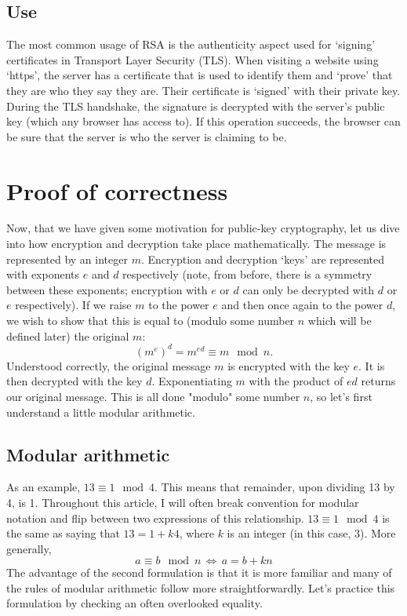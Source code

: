 \documentclass[]{scrartcl}
\theoremstyle{definition}
\begin{document}
\subsection{Use}
The most common usage of RSA is the authenticity aspect used for `signing' certificates in Transport Layer Security (TLS). When visiting a website using `https', the server has a certificate that is used to identify them and `prove' that they are who they say they are. Their certificate is `signed' with their private key. During the TLS handshake, the signature is decrypted with the server's public key (which any browser has access to). If this operation succeeds, the browser can be sure that the server is who the server is claiming to be.

\section{Proof of correctness}\label{sec:poc}
Now, that we have given some motivation for public-key cryptography, let us dive into how encryption and decryption take place mathematically. The message is represented by an integer $m$. Encryption and decryption `keys' are represented with exponents $e$ and $d$ respectively (note, from before, there is a symmetry between these exponents; encryption with $e$ or $d$ can only be decrypted with $d$ or $e$ respectively). If we raise $m$ to the power $e$ and then once again to the power $d$, we wish to show that this is equal to (modulo some number $n$ which will be defined later) the original $m$: 
\begin{equation}\label{eqn:statement}
    (m^e)^d = m^{ed} \equiv m \mod n.
\end{equation}
Understood correctly, the original message $m$ is encrypted with the key $e$. It is then decrypted with the key $d$. Exponentiating $m$ with the product of $ed$ returns our original message. This is all done "modulo" some number $n$, so let's first understand a little modular arithmetic.
\subsection{Modular arithmetic}
As an example, $13 \equiv 1 \mod 4$. This means that remainder, upon dividing 13 by 4, is 1. Throughout this article, I will often break convention for modular notation and flip between two expressions of this relationship. $13 \equiv 1 \mod 4$ is the same as saying that $13 = 1 + k4$, where $k$ is an integer (in this case, 3). More generally,
\begin{equation}
    a \equiv b \mod n \, \Leftrightarrow \, a = b + kn
\end{equation}
The advantage of the second formulation is that it is more familiar and many of the rules of modular arithmetic follow more straightforwardly. Let's practice this formulation by checking an often overlooked equality.
\end{document}

